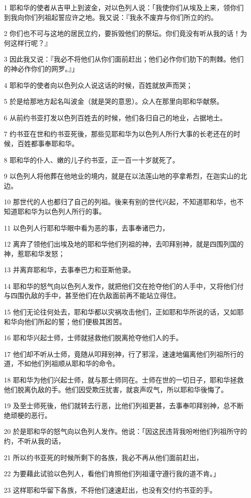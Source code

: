 \par 1 耶和华的使者从吉甲上到波金，对以色列人说：「我使你们从埃及上来，领你们到我向你们列祖起誓应许之地。我又说：『我永不废弃与你们所立的约。
\par 2 你们也不可与这地的居民立约，要拆毁他们的祭坛。你们竟没有听从我的话！为何这样行呢？』
\par 3 因此我又说：『我必不将他们从你们面前赶出；他们必作你们肋下的荆棘。他们的神必作你们的网罗。』」
\par 4 耶和华的使者向以色列众人说这话的时候，百姓就放声而哭；
\par 5 於是给那地方起名叫波金（就是哭的意思）。众人在那里向耶和华献祭。
\par 6 从前约书亚打发以色列百姓去的时候，他们各归自己的地业，占据地土。
\par 7 约书亚在世和约书亚死後，那些见耶和华为以色列人所行大事的长老还在的时候，百姓都事奉耶和华。
\par 8 耶和华的仆人、嫩的儿子约书亚，正一百一十岁就死了。
\par 9 以色列人将他葬在他地业的境内，就是在以法莲山地的亭拿希烈，在迦实山的北边。
\par 10 那世代的人也都归了自己的列祖。後来有别的世代兴起，不知道耶和华，也不知道耶和华为以色列人所行的事。
\par 11 以色列人行耶和华眼中看为恶的事，去事奉诸巴力，
\par 12 离弃了领他们出埃及地的耶和华他们列祖的神，去叩拜别神，就是四围列国的神，惹耶和华发怒；
\par 13 并离弃耶和华，去事奉巴力和亚斯他录。
\par 14 耶和华的怒气向以色列人发作，就把他们交在抢夺他们的人手中，又将他们付与四围仇敌的手中，甚至他们在仇敌面前再不能站立得住。
\par 15 他们无论往何处去，耶和华都以灾祸攻击他们，正如耶和华所说的话，又如耶和华向他们所起的誓；他们便极其困苦。
\par 16 耶和华兴起士师，士师就拯救他们脱离抢夺他们人的手。
\par 17 他们却不听从士师，竟随从叩拜别神，行了邪淫，速速地偏离他们列祖所行的道，不如他们列祖顺从耶和华的命令。
\par 18 耶和华为他们兴起士师，就与那士师同在。士师在世的一切日子，耶和华拯救他们脱离仇敌的手。他们因受欺压扰害，就哀声叹气，所以耶和华後悔了。
\par 19 及至士师死後，他们就转去行恶，比他们列祖更甚，去事奉叩拜别神，总不断绝顽梗的恶行。
\par 20 於是耶和华的怒气向以色列人发作。他说：「因这民违背我吩咐他们列祖所守的约，不听从我的话，
\par 21 所以约书亚死的时候所剩下的各族，我必不再从他们面前赶出，
\par 22 为要藉此试验以色列人，看他们肯照他们列祖谨守遵行我的道不肯。」
\par 23 这样耶和华留下各族，不将他们速速赶出，也没有交付约书亚的手。


